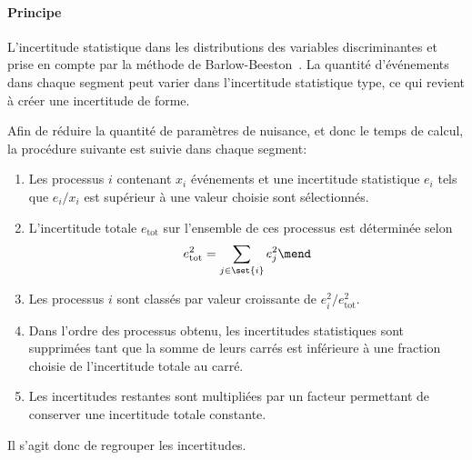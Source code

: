 \paragraph{Principe}
L'incertitude statistique dans les distributions des variables discriminantes et prise en compte par la méthode de Barlow-Beeston~\cite{BarlowBeeston,BarlowBeeston2}.
La quantité d'événements dans chaque segment peut varier dans l'incertitude statistique type, ce qui revient à créer une incertitude de forme.
\par
Afin de réduire la quantité de paramètres de nuisance, et donc le temps de calcul, la procédure suivante est suivie dans chaque segment:
\begin{enumerate}
\item Les processus $i$ contenant $x_i$ événements et une incertitude statistique $e_i$ tels que $e_i/x_i$ est supérieur à une valeur  choisie sont sélectionnés.
\item L'incertitude totale $e_\text{tot}$ sur l'ensemble de ces processus est déterminée selon
\begin{equation}
e_\text{tot}^2 = \sum_{j\in\set{i}} e_j^2
\mend
\end{equation}
\item Les processus $i$ sont classés par valeur croissante de $e_i^2/e_\text{tot}^2$.
\item Dans l'ordre des processus obtenu, les incertitudes statistiques sont supprimées tant que la somme de leurs carrés est inférieure à une fraction  choisie de l'incertitude totale au carré.
\item Les incertitudes restantes sont multipliées par un facteur permettant de conserver une incertitude totale constante.
\end{enumerate}
Il s'agit donc de regrouper les incertitudes.
